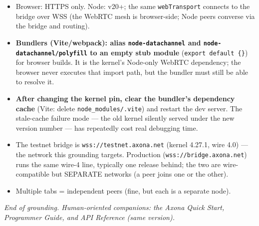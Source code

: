 \documentclass[
  nobib]{tufte-handout}
\providecommand{\tightlist}{%
  \setlength{\itemsep}{0pt}\setlength{\parskip}{0pt}}
\begin{document}
\begin{itemize}
\tightlist
\item
  Browser: HTTPS only. Node: v20+; the same \texttt{webTransport}
  connects to the bridge over WSS (the WebRTC mesh is browser-side; Node
  peers converse via the bridge and routing).
\item
  \textbf{Bundlers (Vite/webpack): alias \texttt{node-datachannel} and
  \texttt{node-datachannel/polyfill} to an empty stub module}
  (\texttt{export\ default\ \{\}}) for browser builds. It is the
  kernel's Node-only WebRTC dependency; the browser never executes that
  import path, but the bundler must still be able to resolve it.
\item
  \textbf{After changing the kernel pin, clear the bundler's dependency
  cache} (Vite: delete \texttt{node\_modules/.vite}) and restart the dev
  server. The stale-cache failure mode --- the old kernel silently
  served under the new version number --- has repeatedly cost real
  debugging time.
\item
  The testnet bridge is \texttt{wss://testnet.axona.net} (kernel 4.27.1,
  wire 4.0) --- the network this grounding targets. Production
  (\texttt{wss://bridge.axona.net}) runs the same wire-4 line, typically
  one release behind; the two are wire-compatible but SEPARATE networks
  (a peer joins one or the other).
\item
  Multiple tabs = independent peers (fine, but each is a separate node).
\end{itemize}

\emph{End of grounding. Human-oriented companions: the Axona Quick
Start, Programmer Guide, and API Reference (same version).}
\end{document}
